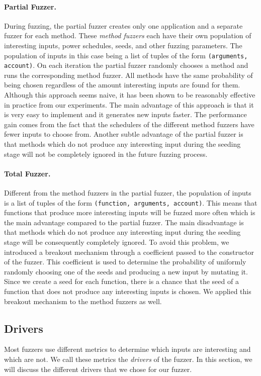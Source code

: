 \paragraph{Partial Fuzzer.} During fuzzing, the partial fuzzer creates only one application and a separate fuzzer for each method.
These \textit{method fuzzers} each have their own population of interesting inputs, power schedules, seeds, and other fuzzing parameters.
The population of inputs in this case being a list of tuples of the form \texttt{(arguments, account)}.
On each iteration the partial fuzzer randomly chooses a method and runs the corresponding method fuzzer.
All methods have the same probability of being chosen regardless of the amount interesting inputs are found for them.
Although this approach seems naive, it has been shown to be reasonably effective in practice from our experiments.
The main advantage of this approach is that it is very easy to implement and it generates new inputs faster.
The performance gain comes from the fact that the schedulers of the different method fuzzers have fewer inputs to choose from.
Another subtle advantage of the partial fuzzer is that methods which do not produce any interesting input during the seeding stage will not be completely ignored in the future fuzzing process.

\paragraph{Total Fuzzer.} Different from the method fuzzers in the partial fuzzer, the population of inputs is a list of tuples of the form \texttt{(function, arguments, account)}.
This means that functions that produce more interesting inputs will be fuzzed more often which is the main advantage compared to the partial fuzzer.
The main disadvantage is that methods which do not produce any interesting input during the seeding stage will be consequently completely ignored.
To avoid this problem, we introduced a breakout mechanism through a coefficient passed to the constructor of the fuzzer.
This coefficient is used to determine the probability of uniformly randomly choosing one of the seeds and producing a new input by mutating it.
Since we create a seed for each function, there is a chance that the seed of a function that does not produce any interesting inputs is chosen.
We applied this breakout mechanism to the method fuzzers as well.



\subsection*{Drivers}\label{section:drivers}
Most fuzzers use different metrics to determine which inputs are interesting and which are not.
We call these metrics the \textit{drivers} of the fuzzer.
In this section, we will discuss the different drivers that we chose for our fuzzer.



